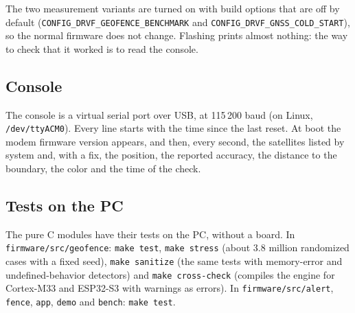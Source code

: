 The two measurement variants are turned on with build options that are off by default
(\texttt{CONFIG\_DRVF\_\allowbreak GEOFENCE\_\allowbreak BENCHMARK} and \texttt{CONFIG\_DRVF\_\allowbreak GNSS\_\allowbreak COLD\_\allowbreak START}), so the normal
firmware does not change. Flashing prints almost nothing: the way to check that it worked is to read the
console.

\subsection{Console}

The console is a virtual serial port over USB, at 115\,200 baud (on Linux, \texttt{/dev/ttyACM0}). Every line
starts with the time since the last reset. At boot the modem firmware version appears, and then, every second,
the satellites listed by system and, with a fix, the position, the reported accuracy, the distance to the
boundary, the color and the time of the check.

\subsection{Tests on the PC}

The pure C modules have their tests on the PC, without a board. In \texttt{firmware/src/geofence}:
\texttt{make test}, \texttt{make stress} (about 3.8 million randomized cases with a fixed seed),
\texttt{make sanitize} (the same tests with memory-error and undefined-behavior detectors) and
\texttt{make cross-check} (compiles the engine for Cortex-M33 and ESP32-S3 with warnings as errors). In
\texttt{firmware/src/alert}, \texttt{fence}, \texttt{app}, \texttt{demo} and \texttt{bench}: \texttt{make test}.

